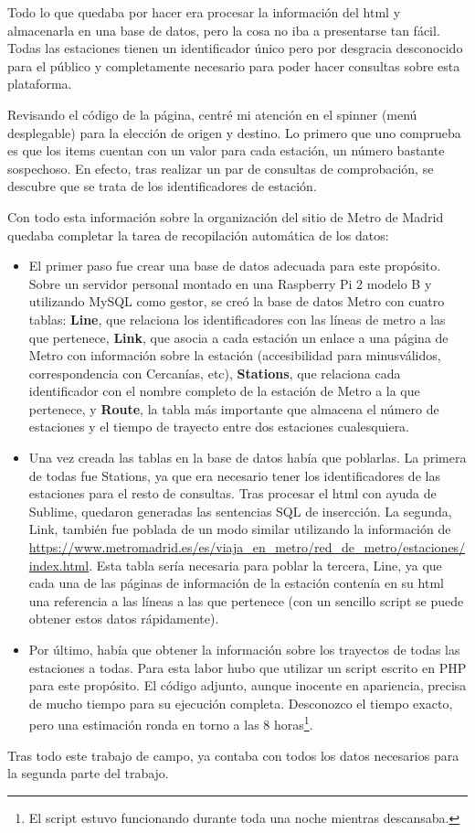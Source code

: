 \documentclass[spanish, a4paper, 12pt] {article}
\begin{document}
Todo lo que quedaba por hacer era procesar la información del html y almacenarla en una base de datos, pero la cosa no iba a presentarse tan fácil. Todas las estaciones tienen un identificador único pero por desgracia desconocido para el público y completamente necesario para poder hacer consultas sobre esta plataforma.\\ \par
Revisando el código de la página, centré mi atención en el spinner (menú desplegable) para la elección de origen y destino. Lo primero que uno comprueba es que los items cuentan con un valor para cada estación, un número bastante sospechoso. En efecto, tras realizar un par de consultas de comprobación, se descubre que se trata de los identificadores de estación.\\ \par
Con todo esta información sobre la organización del sitio de Metro de Madrid quedaba completar la tarea de recopilación automática de los datos:
\begin{itemize}
\item {
El primer paso fue crear una base de datos adecuada para este propósito. Sobre un servidor personal montado en una Raspberry Pi 2 modelo B y utilizando MySQL como gestor, se creó la base de datos Metro con cuatro tablas: {\bf Line}, que relaciona los identificadores con las líneas de metro a las que pertenece, {\bf Link}, que asocia a cada estación un enlace a una página de Metro con información sobre la estación (accesibilidad para minusválidos, correspondencia con Cercanías, etc), {\bf Stations}, que relaciona cada identificador con el nombre completo de la estación de Metro a la que pertenece, y {\bf Route}, la tabla más importante que almacena el número de estaciones y el tiempo de trayecto entre dos estaciones cualesquiera.
}
\item {
Una vez creada las tablas en la base de datos había que poblarlas. La primera de todas fue Stations, ya que era necesario tener los identificadores de las estaciones para el resto de consultas. Tras procesar el html con ayuda de Sublime, quedaron generadas las sentencias SQL de insercción. La segunda, Link, también fue poblada de un modo similar utilizando la información de \url{https://www.metromadrid.es/es/viaja_en_metro/red_de_metro/estaciones/index.html}. Esta tabla sería necesaria para poblar la tercera, Line, ya que cada una de las páginas de información de la estación contenía en su html una referencia a las líneas a las que pertenece (con un sencillo script se puede obtener estos datos rápidamente).
}
\item {
Por último, había que obtener la información sobre los trayectos de todas las estaciones a todas. Para esta labor hubo que utilizar un script escrito en PHP para este propósito. El código adjunto, aunque inocente en apariencia, precisa de mucho tiempo para su ejecución completa. Desconozco el tiempo exacto, pero una estimación ronda en torno a las 8 horas\footnote{El script estuvo funcionando durante toda una noche mientras descansaba.}.
}
\end{itemize}
Tras todo este trabajo de campo, ya contaba con todos los datos necesarios para la segunda parte del trabajo.
\end{document}
